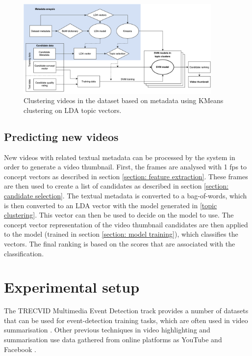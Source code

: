 \documentclass{../resources/sig-alternate-05-2015}
\begin{document}
\begin{figure}[htb!]
	\centering
	\label{figure: topic clustering scheme}
	\includegraphics[width=0.9\textwidth]{resources/topic-clustering}
	\caption{Clustering videos in the dataset based on metadata using KMeans clustering on LDA topic vectors.}
\end{figure}

\subsection{Predicting new videos}

New videos with related textual metadata can be processed by the system in order to generate a video thumbnail. First, the frames are analysed with 1 fps to concept vectors as described in section \ref{section: feature extraction}. These frames are then used to create a list of candidates as described in section \ref{section: candidate selection}. The textual metadata is converted to a bag-of-words, which is then converted to an LDA vector with the model generated in \ref{topic clustering}. This vector can then be used to decide on the model to use. The concept vector representation of the video thumbnail candidates are then applied to the model (trained in section \ref{section: model training}), which classifies the vectors. The final ranking is based on the scores that are associated with the classification.

\section{Experimental setup}
\label{experimental setup dataset}

The TRECVID Multimedia Event Detection track provides a number of datasets that can be used for event-detection training tasks, which are often used in video summarisation \cite{Ajmal:2012hi, Christel:2004in, Money:2008fn}. Other previous techniques in video highlighting and summarisation use data gathered from online platforms as YouTube and Facebook \cite{Yang:2015gi, Almeida:2012be}.
\end{document}
